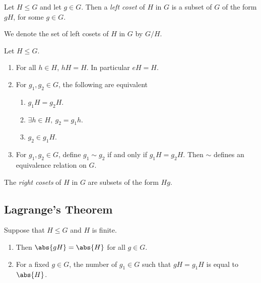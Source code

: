 \documentclass{article}
\begin{document}
\setcounter{theorem}{3}
\begin{definition}
    Let $H\leq G$ and let $g\in G$. Then a \emph{left coset} of $H$
    in $G$ is a subset of $G$ of the form $gH$, for some $g\in G$.
\end{definition}

\setcounter{theorem}{5}
\begin{definition}
    We denote the set of left cosets of $H$ in $G$ by $G/H$.
\end{definition}

\setcounter{theorem}{7}
\begin{theorem}
    Let $H\leq G$.
    \begin{enumerate}
        \item For all $h\in H$, $hH=H$. In particular $eH=H$.
        \item For $g_1,g_2\in G$, the following are equivalent \begin{enumerate}
                  \item $g_1H=g_2H$.
                  \item $\exists h\in H,\: g_2 = g_1h$.
                  \item $g_2\in g_1 H$.
              \end{enumerate}
        \item For $g_1,g_2\in G$, define $g_1\sim g_2$ if and only if $g_1H=g_2H$.
              Then $\sim$ defines an equivalence relation on $G$.
    \end{enumerate}
\end{theorem}

\begin{definition}
    The \emph{right cosets} of $H$ in $G$ are subsets of the form $Hg$.
\end{definition}

\subsection{Lagrange's Theorem}

\begin{lemma}
    Suppose that $H\leq G$ and $H$ is finite.
    \begin{enumerate}
        \item Then $\abs{gH}=\abs{H}$ for all $g\in G$.
        \item For a fixed $g\in G$, the number of $g_1\in G$
              such that $gH=g_1H$ is equal to $\abs{H}$.
    \end{enumerate}
\end{lemma}
\end{document}
